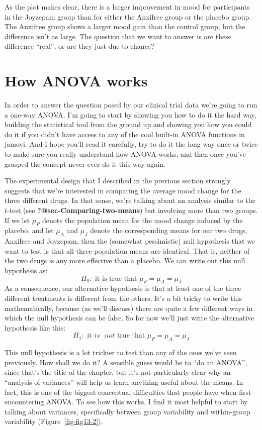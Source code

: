 \documentclass[
  a4paper,
]{book}
\begin{document}
As the plot makes clear, there is a larger improvement in mood for
participants in the Joyzepam group than for either the Anxifree group or
the placebo group. The Anxifree group shows a larger mood gain than the
control group, but the difference isn't as large. The question that we
want to answer is are these difference ``real'', or are they just due to
chance?

\hypertarget{sec-How-ANOVA-works}{%
\section{How ANOVA works}\label{sec-How-ANOVA-works}}

In order to answer the question posed by our clinical trial data we're
going to run a one-way ANOVA. I'm going to start by showing you how to
do it the hard way, building the statistical tool from the ground up and
showing you how you could do it if you didn't have access to any of the
cool built-in ANOVA functions in jamovi. And I hope you'll read it
carefully, try to do it the long way once or twice to make sure you
really understand how ANOVA works, and then once you've grasped the
concept never ever do it this way again.

The experimental design that I described in the previous section
strongly suggests that we're interested in comparing the average mood
change for the three different drugs. In that sense, we're talking about
an analysis similar to the \(t\)-test (see
\textbf{?@sec-Comparing-two-means}) but involving more than two groups.
If we let \(\mu_P\) denote the population mean for the mood change
induced by the placebo, and let \(\mu_A\) and \(\mu_J\) denote the
corresponding means for our two drugs, Anxifree and Joyzepam, then the
(somewhat pessimistic) null hypothesis that we want to test is that all
three population means are identical. That is, neither of the two drugs
is any more effective than a placebo. We can write out this null
hypothesis as: \[H_0: \text{ it is true that } \mu_P=\mu_A=\mu_J\] As a
consequence, our alternative hypothesis is that at least one of the
three different treatments is different from the others. It's a bit
tricky to write this mathematically, because (as we'll discuss) there
are quite a few different ways in which the null hypothesis can be
false. So for now we'll just write the alternative hypothesis like this:
\[H_1: \text{ it } \underline{ is \text{ } not } \text{ true that }
\mu_P=\mu_A=\mu_J\]

This null hypothesis is a lot trickier to test than any of the ones
we've seen previously. How shall we do it? A sensible guess would be to
``do an ANOVA'', since that's the title of the chapter, but it's not
particularly clear why an ``analysis of variances'' will help us learn
anything useful about the means. In fact, this is one of the biggest
conceptual difficulties that people have when first encountering ANOVA.
To see how this works, I find it most helpful to start by talking about
variances, specifically between group variability and within-group
variability (Figure~\ref{fig-fig13-2}).
\end{document}
